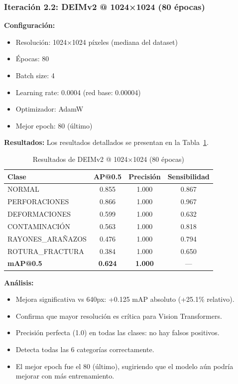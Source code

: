 \subsubsection{Iteración 2.2: DEIMv2 @ 1024×1024 (80 épocas)}

\textbf{Configuración:}
\begin{itemize}
    \item Resolución: 1024×1024 píxeles (mediana del dataset)
    \item Épocas: 80
    \item Batch size: 4
    \item Learning rate: 0.0004 (red base: 0.00004)
    \item Optimizador: AdamW
    \item Mejor epoch: 80 (último)
\end{itemize}

\textbf{Resultados:} Los resultados detallados se presentan en la Tabla~\ref{tab:deimv2_1024_80ep}.

\begin{table}[htbp]
\centering
\begin{tabular}{lccc}
\toprule
\textbf{Clase} & \textbf{AP@0.5} & \textbf{Precisión} & \textbf{Sensibilidad} \\
\midrule
NORMAL & 0.855 & 1.000 & 0.867 \\
PERFORACIONES & 0.866 & 1.000 & 0.967 \\
DEFORMACIONES & 0.599 & 1.000 & 0.632 \\
CONTAMINACIÓN & 0.563 & 1.000 & 0.818 \\
\mbox{RAYONES\_ARAÑAZOS} & 0.476 & 1.000 & 0.794 \\
\mbox{ROTURA\_FRACTURA} & 0.384 & 1.000 & 0.650 \\
\midrule
\textbf{mAP@0.5} & \textbf{0.624} & \textbf{1.000} & --- \\
\bottomrule
\end{tabular}
\caption{Resultados de DEIMv2 @ 1024×1024 (80 épocas)}
\label{tab:deimv2_1024_80ep}
\end{table}

\textbf{Análisis:}
\begin{itemize}
    \item Mejora significativa vs 640px: +0.125 mAP absoluto (+25.1\% relativo).
    \item Confirma que mayor resolución es crítica para Vision Transformers.
    \item Precisión perfecta (1.0) en todas las clases: no hay falsos positivos.
    \item Detecta todas las 6 categorías correctamente.
    \item El mejor epoch fue el 80 (último), sugiriendo que el modelo aún podría mejorar con más entrenamiento.
\end{itemize}

